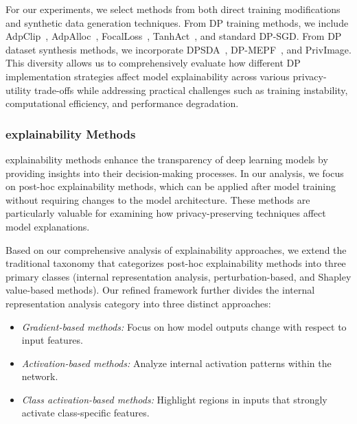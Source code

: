\documentclass{article}
\begin{document}
For our experiments, we select methods from both direct training modifications and synthetic data generation techniques. From DP training methods, we include AdpClip~\cite{andrew2021differentially}, AdpAlloc~\cite{yu2019differentially}, FocalLoss~\cite{shamsabadi2023losing}, TanhAct~\cite{papernot2021tempered}, and standard DP-SGD\cite{abadi2016deep}. From DP dataset synthesis methods, we incorporate DPSDA~\cite{lin2023differentially}, DP-MEPF~\cite{harder2022pre}, and PrivImage\cite{li2023meticulously}. This diversity allows us to comprehensively evaluate how different DP implementation strategies affect model explainability across various privacy-utility trade-offs while addressing practical challenges such as training instability, computational efficiency, and performance degradation.

\subsubsection{explainability Methods}\label{app:xai_method_selection}
explainability methods enhance the transparency of deep learning models by providing insights into their decision-making processes. In our analysis, we focus on post-hoc explainability methods, which can be applied after model training without requiring changes to the model architecture. These methods are particularly valuable for examining how privacy-preserving techniques affect model explanations.

Based on our comprehensive analysis of explainability approaches, we extend the traditional taxonomy that categorizes post-hoc explainability methods into three primary classes (internal representation analysis, perturbation-based, and Shapley value-based methods). Our refined framework further divides the internal representation analysis category into three distinct approaches:

\begin{itemize}[leftmargin=*]
\item \textsl{Gradient-based methods:} Focus on how model outputs change with respect to input features.

\item \textsl{Activation-based methods:} Analyze internal activation patterns within the network.

\item \textsl{Class activation-based methods:} Highlight regions in inputs that strongly activate class-specific features.

\end{itemize}
\end{document}
